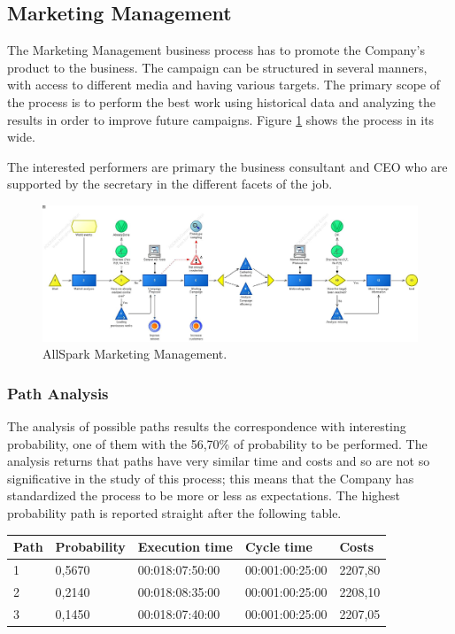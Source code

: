 %

\subsection{Marketing Management}
The Marketing Management business process has to promote the Company's product to the business. The campaign can be structured in several manners, with access to different media and having various targets. The primary scope of the process is to perform the best work using historical data and analyzing the results in order to improve future campaigns. Figure \ref{2img:mark_man} shows the process in its wide.

The interested performers are primary the business consultant and CEO who are supported by the secretary in the different facets of the job.

\begin{figure}[ht!]
\begin{centering}
\includegraphics[scale=0.35, angle=90]{assign2/adonis/imgs/mark_man.jpg}
\caption{AllSpark Marketing Management.}
\label{2img:mark_man}
\end{centering}
\end{figure}


\subsubsection{Path Analysis}
The analysis of possible paths results the correspondence with interesting probability, one of them with the 56,70\% of probability to be performed. The analysis returns that paths have very similar time and costs and so are not so significative in the study of this process; this means that the Company has standardized the process to be more or less as expectations. The highest probability path is reported straight after the following table.

\begin{table}[ht!]
\centering
\begin{tabular}{|l|l|l|l|l|}
\hline
Path&Probability&Execution time&Cycle time&Costs\\
\hline
1&0,5670&00:018:07:50:00&00:001:00:25:00&2207,80\\
\hline
2&0,2140&00:018:08:35:00&00:001:00:25:00&2208,10\\
\hline
3&0,1450&00:018:07:40:00&00:001:00:25:00&2207,05\\
\hline
\end{tabular}
\end{table}

